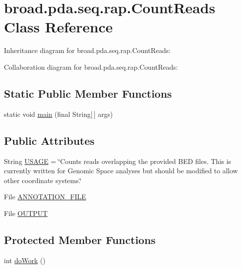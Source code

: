 \hypertarget{classbroad_1_1pda_1_1seq_1_1rap_1_1_count_reads}{\section{broad.\+pda.\+seq.\+rap.\+Count\+Reads Class Reference}
\label{classbroad_1_1pda_1_1seq_1_1rap_1_1_count_reads}
}


Inheritance diagram for broad.\+pda.\+seq.\+rap.\+Count\+Reads\+:


Collaboration diagram for broad.\+pda.\+seq.\+rap.\+Count\+Reads\+:
\subsection*{Static Public Member Functions}
\begin{DoxyCompactItemize}
\item 
static void \hyperlink{classbroad_1_1pda_1_1seq_1_1rap_1_1_count_reads_a34343c95343e2c8295bc6ced344d27a1}{main} (final String\mbox{[}$\,$\mbox{]} args)
\end{DoxyCompactItemize}
\subsection*{Public Attributes}
\begin{DoxyCompactItemize}
\item 
String \hyperlink{classbroad_1_1pda_1_1seq_1_1rap_1_1_count_reads_af6c3679081b0db431ba14659fa05fcd0}{U\+S\+A\+G\+E} = \char`\"{}Counts reads overlapping the provided B\+E\+D files. This is currently written for Genomic Space analyses but should be modified to allow other coordinate systems.\char`\"{}
\item 
File \hyperlink{classbroad_1_1pda_1_1seq_1_1rap_1_1_count_reads_a74e4f261731ff0e423ac6aae8773e0b6}{A\+N\+N\+O\+T\+A\+T\+I\+O\+N\+\_\+\+F\+I\+L\+E}
\item 
File \hyperlink{classbroad_1_1pda_1_1seq_1_1rap_1_1_count_reads_a93ffe0e2c229164b7d1824e14252155c}{O\+U\+T\+P\+U\+T}
\end{DoxyCompactItemize}
\subsection*{Protected Member Functions}
\begin{DoxyCompactItemize}
\item 
int \hyperlink{classbroad_1_1pda_1_1seq_1_1rap_1_1_count_reads_a5abbd23b69813a1009bb1ea543661acf}{do\+Work} ()
\end{DoxyCompactItemize}
